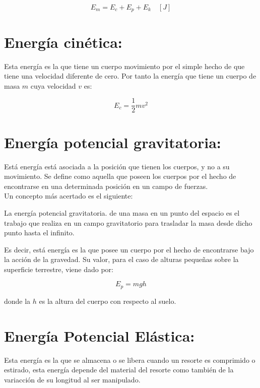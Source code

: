 \begin{equation}
E_m = E_c + E_p + E_k \quad [J]
\end{equation} 

\section{Energía cinética:}

Esta energía es la que tiene un cuerpo movimiento por el simple hecho de que tiene una velocidad diferente de cero. Por tanto la 
energía que tiene un cuerpo de masa $m$ cuya velocidad $v$ es:

\begin{equation}
E_c = \frac{1}{2}mv^2
\end{equation}

\section{Energía potencial gravitatoria:}

Está energía está asociada a la posición que tienen los cuerpos, y no a su movimiento. Se define como aquella que poseen los 
cuerpos por el hecho de encontrarse en una determinada posición en un campo de fuerzas.\\

Un concepto más acertado es el siguiente:

\begin{tcolorbox}
La energía potencial gravitatoria. de una masa en un punto del espacio es el trabajo que realiza en un campo gravitatorio para 
trasladar la masa desde dicho punto hasta el infinito. 
\end{tcolorbox}

Es decir, está energía es la que posee un cuerpo por el hecho de encontrarse bajo la acción de la gravedad. Su valor, para el 
caso 
de alturas pequeñas sobre la superficie terrestre, viene dado por:

\begin{equation}
E_p = mgh
\end{equation}

donde la $h$ es la altura del cuerpo con respecto al suelo.

\section{Energía Potencial Elástica:}

Esta energía es la que se almacena o se libera cuando un resorte es comprimido o estirado, esta energía depende del material del 
resorte como también de la variacción de su longitud al ser manipulado.\\

